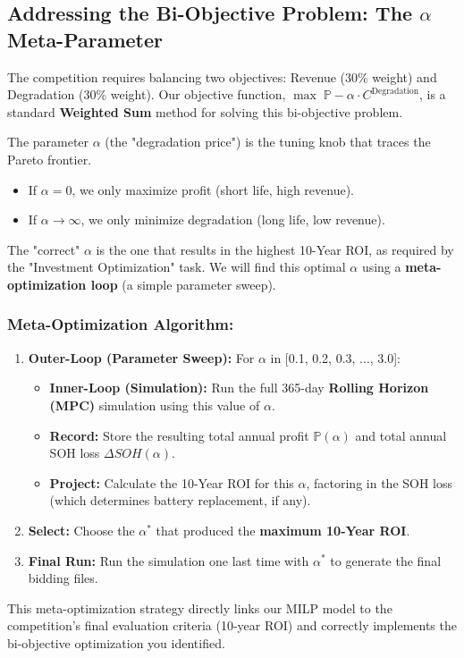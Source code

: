 \documentclass[11pt, a4paper]{article}
\begin{document}
\subsection{Addressing the Bi-Objective Problem: The $\alpha$ Meta-Parameter}
The competition requires balancing two objectives: Revenue (30\% weight) and Degradation (30\% weight). Our objective function, $\max \; \mathbb{P} - \alpha \cdot C^{\mathrm{Degradation}}$, is a standard \textbf{Weighted Sum} method for solving this bi-objective problem.

The parameter $\alpha$ (the "degradation price") is the tuning knob that traces the Pareto frontier.
\begin{itemize}
    \item If $\alpha=0$, we only maximize profit (short life, high revenue).
    \item If $\alpha \to \infty$, we only minimize degradation (long life, low revenue).
\end{itemize}
The "correct" $\alpha$ is the one that results in the highest 10-Year ROI, as required by the "Investment Optimization" task. We will find this optimal $\alpha$ using a \textbf{meta-optimization loop} (a simple parameter sweep).

\subsubsection{Meta-Optimization Algorithm:}
\begin{enumerate}
    \item \textbf{Outer-Loop (Parameter Sweep):} For $\alpha$ in [0.1, 0.2, 0.3, ..., 3.0]:
    \begin{itemize}
        \item \textbf{Inner-Loop (Simulation):} Run the full 365-day \textbf{Rolling Horizon (MPC)} simulation using this value of $\alpha$.
        \item \textbf{Record:} Store the resulting total annual profit $\mathbb{P}(\alpha)$ and total annual SOH loss $\Delta SOH(\alpha)$.
        \item \textbf{Project:} Calculate the 10-Year ROI for this $\alpha$, factoring in the SOH loss (which determines battery replacement, if any).
    \end{itemize}
    \item \textbf{Select:} Choose the $\alpha^*$ that produced the \textbf{maximum 10-Year ROI}.
    \item \textbf{Final Run:} Run the simulation one last time with $\alpha^*$ to generate the final bidding files.
\end{enumerate}
This meta-optimization strategy directly links our MILP model to the competition's final evaluation criteria (10-year ROI) and correctly implements the bi-objective optimization you identified.
\end{document}
